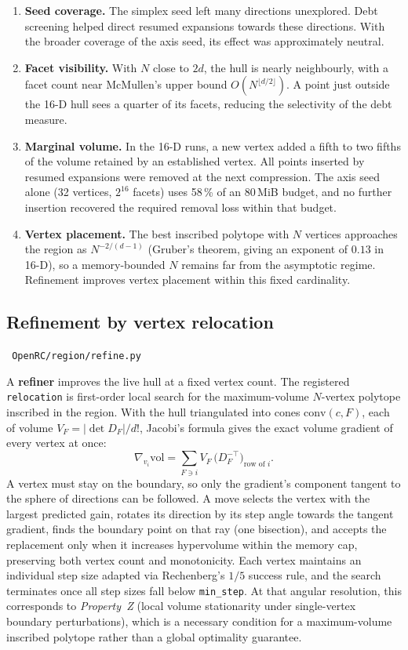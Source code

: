 \documentclass[11pt,a4paper]{report}
\newcommand{\code}[1]{\texttt{\small #1}}
\newcommand{\file}[1]{\texttt{\small\color{nbgrey} #1}}
\begin{document}
\begin{enumerate}
\item \textbf{Seed coverage.} The simplex seed left many directions
  unexplored. Debt screening helped direct resumed expansions towards these
  directions. With the broader coverage of the axis seed, its effect was
  approximately neutral.
\item \textbf{Facet visibility.} With $N$ close to $2d$, the hull is nearly
  neighbourly, with a facet count near McMullen's upper bound
  $O(N^{\lfloor d/2\rfloor})$. A point just outside the 16-D hull sees a
  quarter of its facets, reducing the selectivity of the debt measure.
\item \textbf{Marginal volume.} In the 16-D runs, a new vertex added a fifth
  to two fifths of the volume retained by an established vertex. All points
  inserted by resumed expansions were removed at the next compression.
  The axis seed alone (32 vertices, $2^{16}$ facets) uses 58\,\% of an
  80\,MiB budget, and no further insertion recovered the required removal
  loss within that budget.
\item \textbf{Vertex placement.} The best inscribed
  polytope with $N$ vertices approaches the region as $N^{-2/(d-1)}$
  (Gruber's theorem, giving an exponent of $0.13$ in 16-D), so a
  memory-bounded $N$ remains far from the asymptotic regime. Refinement
  improves vertex placement within this fixed cardinality.
\end{enumerate}

\subsection{Refinement by vertex relocation}
\label{sec:refine}

\file{OpenRC/region/refine.py}

A \textbf{refiner} improves the live hull at a fixed vertex count. The
registered \code{relocation} is first-order local search for the
maximum-volume $N$-vertex polytope inscribed in the region. With the hull
triangulated into cones $\mathrm{conv}(c, F)$, each of volume
$V_F = |\det D_F|/d!$, Jacobi's formula gives the exact volume gradient of every
vertex at once:
\begin{equation}
\nabla_{v_i}\mathrm{vol} = \sum_{F \ni i} V_F\,\bigl(D_F^{-\top}\bigr)_{\text{row of } i}.
\end{equation}
A vertex must stay on the boundary, so only the gradient's component tangent to
the sphere of directions can be followed. A move selects the vertex with the
largest predicted gain, rotates its direction by its step angle towards the
tangent gradient,
finds the boundary point on that ray (one bisection), and accepts the
replacement only when it increases hypervolume within the memory cap,
preserving both vertex count and monotonicity. Each vertex maintains an
individual step size adapted via Rechenberg's $1/5$ success rule, and the
search terminates once all step sizes fall below \code{min\_step}. At that
angular resolution, this corresponds to \emph{Property~Z} (local volume
stationarity under single-vertex boundary perturbations), which is a necessary
condition for a maximum-volume inscribed polytope rather than a global
optimality guarantee.
\end{document}
